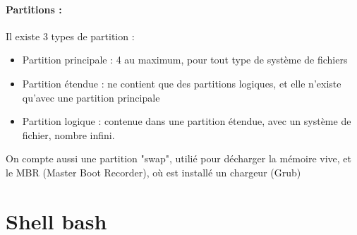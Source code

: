 \documentclass{article}
\begin{document}
\paragraph{Partitions :\\}
Il existe 3 types de partition : \begin{itemize}
	\item Partition principale : 4 au maximum, pour tout type de système de fichiers
	\item Partition étendue : ne contient que des partitions logiques, et elle n'existe qu'avec une partition principale
	\item Partition logique : contenue dans une partition étendue, avec un système de fichier, nombre infini.
\end{itemize}

On compte aussi une partition "swap", utilié pour décharger la mémoire vive, et le MBR (Master Boot Recorder), où est installé un chargeur (Grub)
\section{Shell bash}
\end{document}

